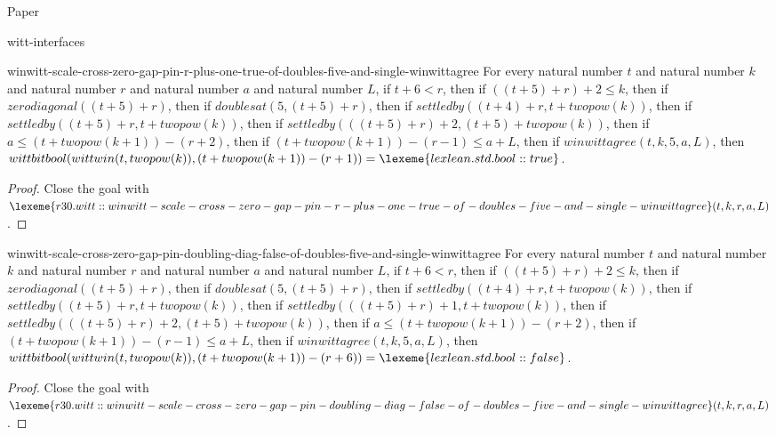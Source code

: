 \begin{lexlean}{Paper}
\begin{section}{witt-interfaces}
  \begin{theorem}{winwitt-scale-cross-zero-gap-pin-r-plus-one-true-of-doubles-five-and-single-winwittagree}
  For every natural number \(t\) and natural number \(k\) and natural number \(r\) and natural number \(a\) and natural number \(L\), if \(t + 6 < r\), then if \(((t + 5) + r) + 2 ≤ k\), then if \(zerodiagonal((t + 5) + r)\), then if \(doublesat(5, (t + 5) + r)\), then if \(settledby((t + 4) + r, t + twopow(k))\), then if \(settledby((t + 5) + r, t + twopow(k))\), then if \(settledby(((t + 5) + r) + 2, (t + 5) + twopow(k))\), then if \(a ≤ (t + twopow(k + 1)) - (r + 2)\), then if \((t + twopow(k + 1)) - (r - 1) ≤ a + L\), then if \(winwittagree(t, k, 5, a, L)\), then \(wittbitbool(wittwin(t, twopow(k)), (t + twopow(k + 1)) - (r + 1)) = \lexeme{lexlean.std.bool::true}\).
  \begin{proof}
  Close the goal with \(\lexeme{r30.witt::winwitt-scale-cross-zero-gap-pin-r-plus-one-true-of-doubles-five-and-single-winwittagree}(t, k, r, a, L)\).
  \end{proof}
  \end{theorem}

  \begin{theorem}{winwitt-scale-cross-zero-gap-pin-doubling-diag-false-of-doubles-five-and-single-winwittagree}
  For every natural number \(t\) and natural number \(k\) and natural number \(r\) and natural number \(a\) and natural number \(L\), if \(t + 6 < r\), then if \(((t + 5) + r) + 2 ≤ k\), then if \(zerodiagonal((t + 5) + r)\), then if \(doublesat(5, (t + 5) + r)\), then if \(settledby((t + 4) + r, t + twopow(k))\), then if \(settledby((t + 5) + r, t + twopow(k))\), then if \(settledby(((t + 5) + r) + 1, t + twopow(k))\), then if \(settledby(((t + 5) + r) + 2, (t + 5) + twopow(k))\), then if \(a ≤ (t + twopow(k + 1)) - (r + 2)\), then if \((t + twopow(k + 1)) - (r - 1) ≤ a + L\), then if \(winwittagree(t, k, 5, a, L)\), then \(wittbitbool(wittwin(t, twopow(k)), (t + twopow(k + 1)) - (r + 6)) = \lexeme{lexlean.std.bool::false}\).
  \begin{proof}
  Close the goal with \(\lexeme{r30.witt::winwitt-scale-cross-zero-gap-pin-doubling-diag-false-of-doubles-five-and-single-winwittagree}(t, k, r, a, L)\).
  \end{proof}
  \end{theorem}


\end{section}
\end{lexlean}
